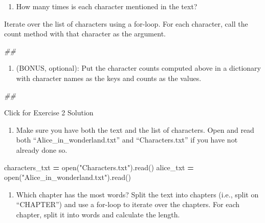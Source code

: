 \documentclass[
]{book}
\newenvironment{Shaded}{\begin{snugshade}}{\end{snugshade}}
\newcommand{\BuiltInTok}[1]{#1}
\newcommand{\CommentTok}[1]{\textcolor[rgb]{0.56,0.35,0.01}{\textit{#1}}}
\newcommand{\NormalTok}[1]{#1}
\newcommand{\OperatorTok}[1]{\textcolor[rgb]{0.81,0.36,0.00}{\textbf{#1}}}
\newcommand{\StringTok}[1]{\textcolor[rgb]{0.31,0.60,0.02}{#1}}
\providecommand{\tightlist}{%
  \setlength{\itemsep}{0pt}\setlength{\parskip}{0pt}}
\begin{document}
\begin{enumerate}
\def\labelenumi{\arabic{enumi}.}
\setcounter{enumi}{2}
\tightlist
\item
  How many times is each character mentioned in the text?
\end{enumerate}

Iterate over the list of characters using a for-loop.
For each character, call the count method with that character as the argument.

\begin{Shaded}
\begin{Highlighting}[]
\CommentTok{\#\#}
\end{Highlighting}
\end{Shaded}

\begin{enumerate}
\def\labelenumi{\arabic{enumi}.}
\setcounter{enumi}{3}
\tightlist
\item
  (BONUS, optional): Put the character counts computed
  above in a dictionary with character names as the keys and
  counts as the values.
\end{enumerate}

\begin{Shaded}
\begin{Highlighting}[]
\CommentTok{\#\#}
\end{Highlighting}
\end{Shaded}

{Click for Exercise 2 Solution}

\begin{enumerate}
\def\labelenumi{\arabic{enumi}.}
\tightlist
\item
  Make sure you have both the text and the list of characters.
  Open and read both ``Alice\_in\_wonderland.txt'' and ``Characters.txt'' if you have not already done so.
\end{enumerate}

\begin{Shaded}
\begin{Highlighting}[]
\NormalTok{characters\_txt }\OperatorTok{=} \BuiltInTok{open}\NormalTok{(}\StringTok{"Characters.txt"}\NormalTok{).read()}
\NormalTok{alice\_txt }\OperatorTok{=} \BuiltInTok{open}\NormalTok{(}\StringTok{"Alice\_in\_wonderland.txt"}\NormalTok{).read()}
\end{Highlighting}
\end{Shaded}

\begin{enumerate}
\def\labelenumi{\arabic{enumi}.}
\setcounter{enumi}{1}
\tightlist
\item
  Which chapter has the most words?
  Split the text into chapters (i.e., split on ``CHAPTER'') and use a for-loop to iterate over the chapters.
  For each chapter, split it into words and calculate the length.
\end{enumerate}
\end{document}
